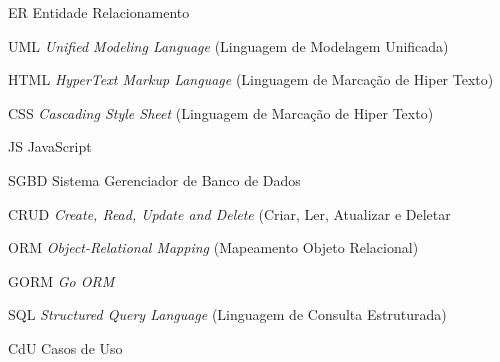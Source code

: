 %
%

\begin{siglas}
	\setlength{\baselineskip}{0.7\baselineskip}

    \item[ER] Entidade Relacionamento
    \item[UML] \textit{Unified Modeling Language} (Linguagem de Modelagem Unificada)
    \item[HTML] \textit{HyperText Markup Language} (Linguagem de Marcação de Hiper Texto)
    \item[CSS] \textit{Cascading Style Sheet} (Linguagem de Marcação de Hiper Texto)
    \item[JS] JavaScript
		\item[SGBD] Sistema Gerenciador de Banco de Dados
		\item[CRUD] \textit{Create, Read, Update and Delete} (Criar, Ler, Atualizar e Deletar
		\item[ORM] \textit{Object-Relational Mapping} (Mapeamento Objeto Relacional)
		\item[GORM] \textit{Go ORM}
		\item[SQL] \textit{Structured Query Language} (Linguagem de Consulta Estruturada)
		\item[CdU] Casos de Uso

\end{siglas}
